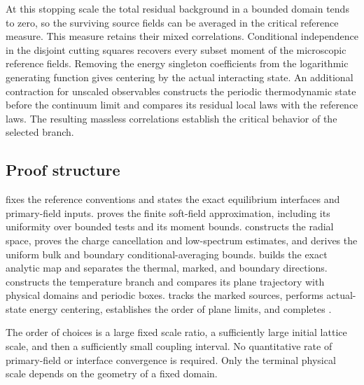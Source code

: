 At this stopping scale the total residual background in a bounded domain
tends to zero, so the surviving source fields can be averaged in the
critical reference measure. This measure retains their mixed
correlations. Conditional independence in the disjoint cutting squares
recovers every subset moment of the microscopic reference fields.
Removing the energy singleton coefficients
from the logarithmic generating function gives centering by the actual
interacting state. An additional contraction for unscaled observables
constructs the periodic thermodynamic state before the continuum limit
and compares its residual local laws with the reference laws. The resulting massless correlations establish the critical behavior of
the selected branch.

\subsection{Proof structure}

 fixes the reference conventions and states the exact
equilibrium interfaces and primary-field inputs.
 proves the finite soft-field approximation, including
its uniformity over bounded tests and its moment bounds.
 constructs the radial space, proves the charge
cancellation and low-spectrum estimates, and derives the uniform
bulk and boundary conditional-averaging bounds.
 builds the exact analytic map and separates
the thermal, marked, and boundary directions.
 constructs the temperature branch and compares its
plane trajectory with physical domains and periodic boxes.
 tracks the marked sources, performs actual-state
energy centering, establishes the order of plane limits, and completes
.

The order of choices is a large fixed scale ratio, a sufficiently
large initial lattice scale, and then a sufficiently small coupling
interval. No quantitative rate of primary-field or interface
convergence is required. Only the terminal physical scale depends on
the geometry of a fixed domain.
